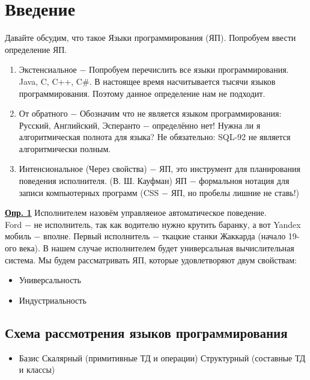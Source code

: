 \documentclass[a4paper, 12pt, titlepage, finall]{extreport}
\begin{document}
    \chapter*{Введение}
        Давайте обсудим, что такое Языки программирования (ЯП). Попробуем ввести определение ЯП.
        \begin{enumerate}
            \item Экстенсиальное $-$ Попробуем перечислить все языки программирования. Java, C, C++, C\#.
            В настоящее время насчитывается тысячи языков программирования. Поэтому данное определение нам не подходит.
            \item От обратного $-$ Обозначим что не является языком программирования: Русский, Английский, Эсперанто $-$ определённо нет!
            Нужна ли я алгоритмическая полнота для языка? Не обязательно: SQL-92 не является алгоритмически полным.
            \item Интенсиональное (Через свойства) $-$ ЯП, это инструмент для планирования поведения исполнителя. (В. Ш. Кауфман)
            ЯП $-$ формальноя нотация для записи компьютерных программ (CSS $-$ ЯП, но пробелы лишние не ставь!) 
        \end{enumerate}

        \underline{\bf Опр. 1} Исполнителем назовём управляеиое автоматическое поведение.\\
        Ford $-$ не исполнитель, так как водителю нужно крутить баранку, а вот Yandex мобиль $-$ вполне.
        Первый исполнитель $-$ ткацкие станки Жаккарда (начало 19-ого века).
        В нашем случае исполнителем будет универсальная вычислительная система. Мы будем рассматривать ЯП, которые удовлетворяют двум свойствам:
        \begin{itemize}
            \item Универсальность
            \item Индустриальность
        \end{itemize}
        \section*{Схема рассмотрения языков программирования}
            \begin{itemize}
                \item Базис
                    \subitem Скалярный (примитивные ТД и операции)
                    \subitem Структурный (составные ТД и классы)
            \end{itemize}
\end{document}
